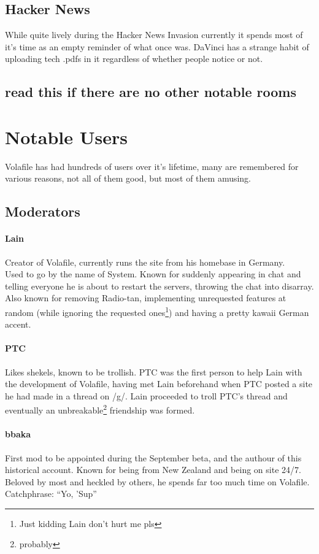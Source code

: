 \documentclass[12pt]{report}
\begin{document}
{\section{Hacker News}
	While quite lively during the Hacker News Invasion currently it spends most of it's time as an empty reminder of what once was. DaVinci has a strange habit of uploading tech .pdfs in it regardless of whether people notice or not.
	
\section{read this if there are no other notable rooms}


\chapter{Notable Users}
	Volafile has had hundreds of users over it's lifetime, many are remembered for various reasons, not all of them good, but most of them amusing.

\section{Moderators}


\subsubsection{Lain}
	Creator of Volafile, currently runs the site from his homebase in Germany. \\
	Used to go by the name of System. Known for suddenly appearing in chat and telling everyone he is about to restart the servers, throwing  the chat into disarray. Also known for removing Radio-tan, implementing unrequested features at random (while ignoring the requested ones\footnote{Just kidding Lain don't hurt me pls}) and having a pretty kawaii German accent.
	
	
\subsubsection{PTC}
	Likes shekels, known to be trollish. PTC was the first person to help Lain with the development of Volafile, having met Lain beforehand when PTC posted a site he had made in a thread on /g/. Lain proceeded to troll PTC's thread and eventually an unbreakable\footnote{probably} friendship was formed.
	
	
\subsubsection{bbaka}
	First mod to be appointed during the September beta, and the authour of this historical account. Known for being from New Zealand and being on site 24/7. Beloved by most and heckled by others, he spends far too much time on Volafile.
	Catchphrase: ``Yo, 'Sup''
	
}
\end{document}
